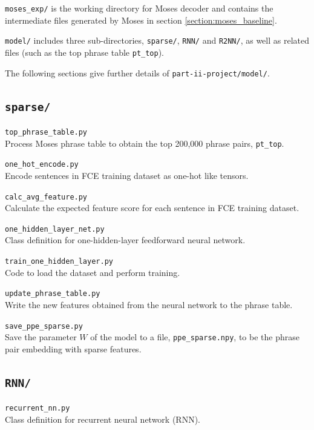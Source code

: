 \documentclass[12pt,a4paper,twoside,openright]{report}
\begin{document}
\hfill\begin{minipage}{\dimexpr\textwidth-1cm}
    \texttt{moses\_exp/} is the working directory for Moses decoder and contains the intermediate files generated by Moses in section \ref{section:moses_baseline}.
\end{minipage}

\hfill\begin{minipage}{\dimexpr\textwidth-1cm}
    \texttt{model/} includes three sub-directories, \texttt{sparse/}, \texttt{RNN/} and \texttt{R2NN/}, as well as related files (such as the top phrase table \texttt{pt\_top}).
\end{minipage}

The following sections give further details of \texttt{part-ii-project/model/}.

\subsection{\texttt{sparse/}}
\texttt{top\_phrase\_table.py}\\
Process Moses phrase table to obtain the top 200,000 phrase pairs, \texttt{pt\_top}.

\texttt{one\_hot\_encode.py}\\
Encode sentences in FCE training dataset as one-hot like tensors.

\texttt{calc\_avg\_feature.py}\\
Calculate the expected feature score for each sentence in FCE training dataset.

\texttt{one\_hidden\_layer\_net.py}\\
Class definition for one-hidden-layer feedforward neural network.

\texttt{train\_one\_hidden\_layer.py}\\
Code to load the dataset and perform training.

\texttt{update\_phrase\_table.py}\\
Write the new features obtained from the neural network to the phrase table.

\texttt{save\_ppe\_sparse.py}\\
Save the parameter $W$ of the model to a file, \texttt{ppe\_sparse.npy}, to be the phrase pair embedding with sparse features.

\subsection{\texttt{RNN/}}
\texttt{recurrent\_nn.py}\\
Class definition for recurrent neural network (RNN).
\end{document}
